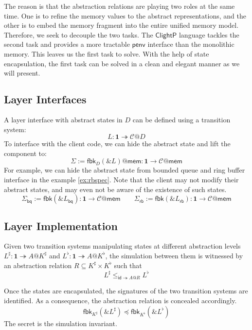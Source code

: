 \documentclass[acmsmall,screen,review,anonymous]{acmart}
\newcommand{\kw}[1]{\ensuremath{ \mathsf{#1} }}
\renewcommand{\preceq}{\preccurlyeq}
\newcommand{\ClightP}{\ensuremath{ \mathsf{ClightP} }}
\begin{document}
The reason is that the abstraction relations
are playing two roles at the same time.
One is to refine the memory values to the abstract representations,
and the other is to embed the memory fragment
into the entire unified memory model.
Therefore, we seek to decouple the two tasks.
The $\ClightP$ language tackles the second task
and provides a more tractable $\kw{penv}$ interface
than the monolithic memory.
This leaves us the first task to solve.
With the help of state encapsulation,
the first task can be solved in a clean and elegant manner
as we will present.

\subsection{Layer Interfaces} %

A layer interface with abstract states in $D$
can be defined using a transition system:
\[
  L : \mathbf{1} \twoheadrightarrow \mathcal{C}@D
\]
To interface with the client code,
we can hide the abstract state and lift the component to:
\[
  \Sigma := \kw{fbk}_D(\&L)@\kw{mem} : \mathbf{1} \rightarrow \mathcal{C}@\kw{mem}
\]
For example, we can hide the abstract state
from bounded queue and ring buffer interface in the example \ref{ex:rbspec}.
Note that the client may not modify their abstract states,
and may even not be aware of the existence of such states.
\[
  \Sigma_\kw{bq} := \kw{fbk}(\&L_\kw{bq}): \mathbf{1} \rightarrow \mathcal{C}@\kw{mem} \qquad
  \Sigma_\kw{rb} := \kw{fbk}(\&L_\kw{rb}): \mathbf{1} \rightarrow \mathcal{C}@\kw{mem}
\]


\subsection{Layer Implementation}
\label{sec:cal:impl}

Given two transition systems manipulating states
at different abstraction levels
$L^\sharp: \mathbf{1} \twoheadrightarrow A@K^\sharp$
and
$L^\flat: \mathbf{1} \twoheadrightarrow A@K^\flat$,
the simulation between them is witnessed
by an abstraction relation $R \subseteq K^\sharp \times K^\flat$
such that
\[
  L^\sharp \le_{\kw{id} \twoheadrightarrow A@R} L^\flat
\]

Once the states are encapsulated,
the signatures of the two transition systems are identified.
As a consequence, the abstraction relation is concealed accordingly.
\[
  \kw{fbk}_{K^\sharp}(\& L^\sharp) \preceq \kw{fbk}_{K^\flat}(\& L^\flat)
\]
The secret is the simulation invariant.
\end{document}
